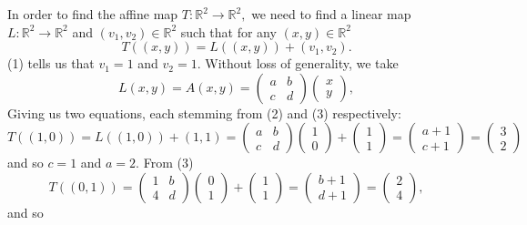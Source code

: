 \documentclass[11pt]{article}
\newcommand{\bbR}{\mathbb{R}}
\begin{document}
\begin{solution}
    In order to find the affine map $T: \bbR^2 \to \bbR^2,$ we need to find a linear map $L: \bbR^2 \to \bbR^2$ and $(v_1, v_2)\in \bbR^2$ such that for any $(x,y) \in \bbR^2$
    \[T((x,y)) = L((x,y)) + (v_1, v_2).\] (1) tells us that $v_1 = 1$ and $v_2 = 1.$ Without loss of generality, we take 
    \[L(x,y) = A(x,y) = \begin{pmatrix}
         a& b\\
         c& d
    \end{pmatrix}\begin{pmatrix}
        x\\ y
    \end{pmatrix},\] Giving us two equations, each stemming from (2) and (3) respectively:
    \[T((1,0)) = L((1,0)) + (1,1) = \begin{pmatrix}
        a & b\\
        c & d
    \end{pmatrix}\begin{pmatrix}
        1\\0
    \end{pmatrix} + \begin{pmatrix}
        1\\ 1
    \end{pmatrix} = \begin{pmatrix}
        a +1\\
        c +1
    \end{pmatrix} = \begin{pmatrix}
        3\\2
    \end{pmatrix}\] and so $c = 1$ and $a = 2.$ From (3)
    \[T((0,1)) = \begin{pmatrix}
        1 & b\\
        4 & d
    \end{pmatrix} \begin{pmatrix}
        0\\ 1
    \end{pmatrix} + \begin{pmatrix}
        1\\1
    \end{pmatrix} = \begin{pmatrix}
        b+1\\
        d+1
    \end{pmatrix} = \begin{pmatrix}
        2\\4
    \end{pmatrix},\] and so 

\end{solution}
\end{document}
